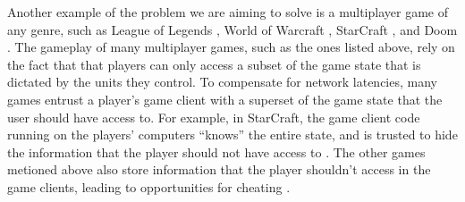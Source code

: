 Another example of the problem we are aiming to solve is a multiplayer game of
any genre, such as League of Legends \cite{riot2009lol},
World of Warcraft \cite{blizzard2004wow}, StarCraft \cite{blizzard2010sc2}, and
Doom \cite{id2004doom}. The gameplay of many multiplayer games, such as the
ones listed above, rely on the fact that that players can only access a subset
of the game state that is dictated by the units they control. To compensate for
network latencies, many games entrust a player's game client with a superset
of the game state that the user should have access to. For example, in
StarCraft, the game client code running on the players' computers ``knows'' the
entire state, and is trusted to hide the information that the player should not
have access to \cite{hardy2009cheating}. The other games metioned above also
store information that the player shouldn't access in the game clients, leading
to opportunities for cheating \cite{youtube2013lolcheating}
\cite{youtube2008quake3cheating}.
